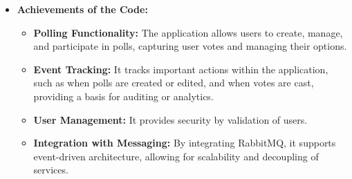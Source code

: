 \begin{itemize}
    \item \textbf{Achievements of the Code:}
    \begin{itemize}
        \item \textbf{Polling Functionality:} The application allows users to create, manage, and participate in polls, capturing user votes and managing their options.
        \item \textbf{Event Tracking:} It tracks important actions within the application, such as when polls are created or edited, and when votes are cast, providing a basis for auditing or analytics.
        \item \textbf{User Management:} It provides security by validation of users.
        \item \textbf{Integration with Messaging:} By integrating RabbitMQ, it supports event-driven architecture, allowing for scalability and decoupling of services.
    \end{itemize}
\end{itemize}

